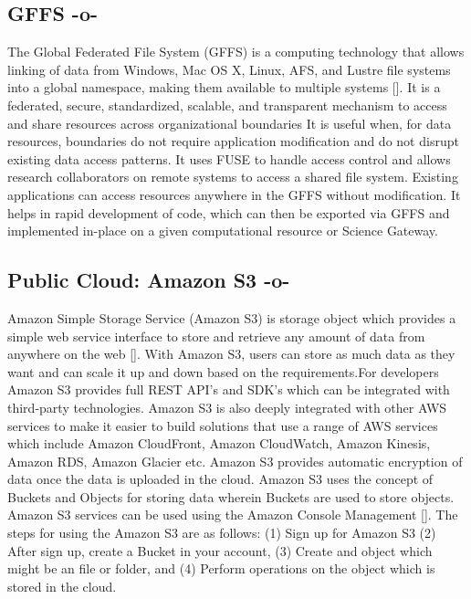 \subsection{GFFS -o-}

The Global Federated File System (GFFS) is a computing technology that
allows linking of data from Windows, Mac OS X, Linux, AFS, and Lustre
file systems into a global namespace, making them available to
multiple systems [\cite{www-gffs}].  It is a federated, secure,
standardized, scalable, and transparent mechanism to access and share
resources across organizational boundaries It is useful when, for data
resources, boundaries do not require application modification and do
not disrupt existing data access patterns. It uses FUSE to handle
access control and allows research collaborators on remote systems to
access a shared file system. Existing applications can access
resources anywhere in the GFFS without modification. It helps in rapid
development of code, which can then be exported via GFFS and
implemented in-place on a given computational resource or Science
Gateway.


     
\subsection{Public Cloud: Amazon S3 -o-}

Amazon Simple Storage Service (Amazon S3) is storage object which
provides a simple web service interface to store and retrieve any
amount of data from anywhere on the web [\cite{www-amazon-s3}]. With
Amazon S3, users can store as much data as they want and can scale it
up and down based on the requirements.For developers Amazon S3
provides full REST API's and SDK's which can be integrated with
third-party technologies. Amazon S3 is also deeply integrated with
other AWS services to make it easier to build solutions that use a
range of AWS services which include Amazon CloudFront, Amazon
CloudWatch, Amazon Kinesis, Amazon RDS, Amazon Glacier etc. Amazon S3
provides automatic encryption of data once the data is uploaded in the
cloud. Amazon S3 uses the concept of Buckets and Objects for storing
data wherein Buckets are used to store objects. Amazon S3 services can
be used using the Amazon Console
Management [\cite{www-amazon-s3-docs}]. The steps for using the Amazon
S3 are as follows: (1) Sign up for Amazon S3 (2) After sign up, create
a Bucket in your account, (3) Create and object which might be an file
or folder, and (4) Perform operations on the object which is stored in
the cloud.



